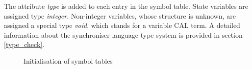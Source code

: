 The attribute \emph{type} is added to each entry in the symbol table. State variables are assigned type \emph{integer}. Non-integer variables, whose structure is unknown, are assigned a special type \emph{void}, which stands for a variable CAL term. A detailed information about the synchroniser language type system is provided in section \ref{type_check}.


\begin{figure}[h!]
\noindent{}
\caption{Initialisation of symbol tables\label{symtab_init}}
\end{figure}



